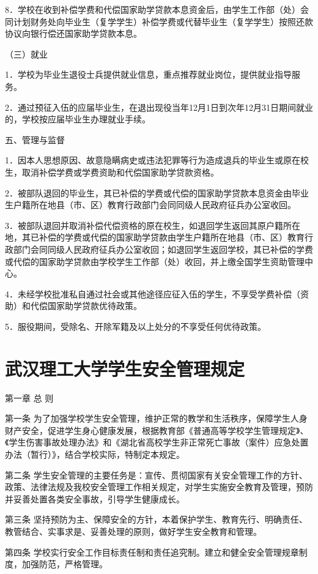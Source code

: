 \documentclass[UTF8,12pt,a4paper]{report}
\begin{document}
8．学校在收到补偿学费和代偿国家助学贷款本息资金后，由学生工作部（处）会同计划财务处向毕业生（复学学生）补偿学费或代替毕业生（复学学生）按照还款协议向银行偿还国家助学贷款本息。

（三）就业

1．学校为毕业生退役士兵提供就业信息，重点推荐就业岗位，提供就业指导服务。

2．通过预征入伍的应届毕业生，在退出现役当年12月1日到次年12月31日期间就业的，学校按应届毕业生办理就业手续。

五、管理与监督

1．因本人思想原因、故意隐瞒病史或违法犯罪等行为造成退兵的毕业生或原在校生，取消补偿学费或学费资助和代偿国家助学贷款资格。

2．被部队退回的毕业生，其已补偿的学费或代偿的国家助学贷款本息资金由毕业生户籍所在地县（市、区）教育行政部门会同同级人民政府征兵办公室收回。

3．被部队退回并取消补偿代偿资格的原在校生，如退回学生返回其原户籍所在地，其已补偿的学费或代偿的国家助学贷款由学生户籍所在地县（市、区）教育行政部门会同同级人民政府征兵办公室收回；如退回学生返回学校，其已补偿的学费或代偿的国家助学贷款由学校学生工作部（处）收回，并上缴全国学生资助管理中心。

4．未经学校批准私自通过社会或其他途径应征入伍的学生，不享受学费补偿（资助）和代偿国家助学贷款优待政策。

5．服役期间，受除名、开除军籍及以上处分的不享受任何优待政策。

\chapter{武汉理工大学学生安全管理规定}
第一章 总 则

第一条 为了加强学校学生安全管理，维护正常的教学和生活秩序，保障学生人身财产安全，促进学生身心健康发展，根据教育部《普通高等学校学生管理规定》、《学生伤害事故处理办法》和《湖北省高校学生非正常死亡事故（案件）应急处置办法（暂行）》，结合学校实际，特制定本规定。

第二条 学生安全管理的主要任务是：宣传、贯彻国家有关安全管理工作的方针、政策、法律法规及我校安全管理工作相关规定，对学生实施安全教育及管理，预防并妥善处置各类安全事故，引导学生健康成长。

第三条 坚持预防为主、保障安全的方针，本着保护学生、教育先行、明确责任、教管结合、实事求是、妥善处理的原则，做好学生安全教育和管理。

第四条 学校实行安全工作目标责任制和责任追究制。建立和健全安全管理规章制度，加强防范，严格管理。
\end{document}
